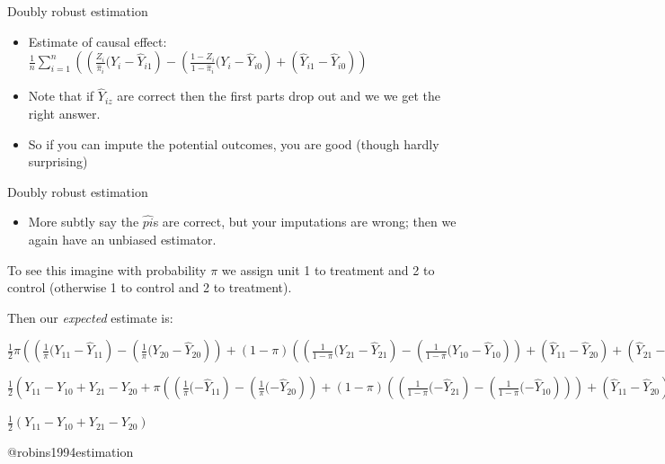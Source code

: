 \documentclass[
  11pt,
  ignorenonframetext,
]{beamer}
\providecommand{\tightlist}{%
  \setlength{\itemsep}{0pt}\setlength{\parskip}{0pt}}\usepackage{longtable,booktabs,array}
\begin{document}
\begin{frame}{Doubly robust estimation}
\protect\hypertarget{doubly-robust-estimation-2}{}
\begin{itemize}
\item
  Estimate of causal effect:
  \(\frac{1}{n}\sum_{i=1}^n\left(\left(\frac{Z_i}{\hat{\pi}_i}(Y_i - \hat{Y}_{i1}\right) - \left(\frac{1-Z_i}{1-\hat{\pi}_i}(Y_i - \hat{Y}_{i0}\right) + \left(\hat{Y}_{i1} - \hat{Y}_{i0}\right) \right)\)
\item
  Note that if \(\hat{Y}_{iz}\) are correct then the first parts drop
  out and we we get the right answer.
\item
  So if you can impute the potential outcomes, you are good (though
  hardly surprising)
\end{itemize}
\end{frame}

\begin{frame}{Doubly robust estimation}
\protect\hypertarget{doubly-robust-estimation-3}{}
\begin{itemize}
\tightlist
\item
  More subtly say the \(\hat{pi}\)s are correct, but your imputations
  are wrong; then we again have an unbiased estimator.
\end{itemize}

To see this imagine with probability \(\pi\) we assign unit 1 to
treatment and 2 to control (otherwise 1 to control and 2 to treatment).

Then our \emph{expected} estimate is:

\(\frac12\pi\left(\left(\frac{1}{\pi}(Y_{11} - \hat{Y}_{11}\right) - \left(\frac{1}{\pi}(Y_{20} - \hat{Y}_{20}\right) \right) + (1-\pi)\left(\left(\frac{1}{1-\pi}(Y_{21} - \hat{Y}_{21}\right) - \left(\frac{1}{1-\pi}(Y_{10} - \hat{Y}_{10}\right) \right) + \left(\hat{Y}_{11} - \hat{Y}_{20}\right) + \left(\hat{Y}_{21} - \hat{Y}_{10}\right)\)

\(\frac12\left(Y_{11} - Y_{10} + Y_{21}- Y_{20} +\pi\left(\left(\frac{1}{\pi}( - \hat{Y}_{11}\right) - \left(\frac{1}{\pi}( - \hat{Y}_{20}\right) \right) + (1-\pi)\left(\left(\frac{1}{1-\pi}( - \hat{Y}_{21}\right) - \left(\frac{1}{1-\pi}(- \hat{Y}_{10}\right) \right)\right) + \left(\hat{Y}_{11} - \hat{Y}_{20}\right) + \left(\hat{Y}_{21} - \hat{Y}_{10}\right)\)

\(\frac12\left(Y_{11} - Y_{10} + Y_{21}- Y_{20}\right)\)

@robins1994estimation
\end{frame}
\end{document}
